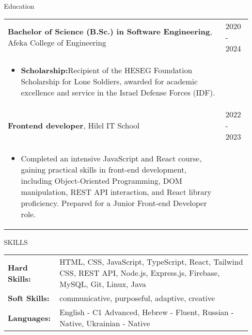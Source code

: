 \documentclass{resume}
\begin{document}

 \begin{rSection}{Education}

  \begin{tabular}{@{}p{}p{}}
  {\bf Bachelor of Science (B.Sc.) in Software Engineering}, Afeka College of Engineering & \hfill 2020 - 2024\hspace*{1em} \\
  \begin{itemize}
   \item \textbf{Scholarship:}Recipient of the HESEG Foundation Scholarship for Lone Soldiers, awarded for academic excellence and service in the Israel Defense Forces (IDF).
  \end{itemize}
  & \hfill \\
  {\bf Frontend developer}, Hilel IT School & \hfill 2022 - 2023\hspace*{1em} \\
  \begin{itemize}
   \item Completed an intensive JavaScript and React course, gaining practical skills in front-end development, including Object-Oriented Programming, DOM manipulation, REST API interaction, and React library proficiency. Prepared for a Junior Front-end Developer role.
  \end{itemize}
  \end{tabular}
 \end{rSection}

 \begin{rSection}{SKILLS}
  \begin{tabularx}{\textwidth}{@{}>{\textbullet\hspace{\labelsep}\bfseries}l X@{}}
   \vspace{0.5em}
   \hspace{\labelsep}Hard Skills: & HTML, CSS, JavaScript, TypeScript, React, Tailwind CSS, REST API, Node.js, Express.js, Firebase, MySQL, Git, Linux, Java \\
   \vspace{0.5em}
   \hspace{\labelsep}Soft Skills: & communicative, purposeful, adaptive, creative\\
   \vspace{0.5em}
   \hspace{\labelsep}Languages: & English - C1 Advanced, Hebrew - Fluent, Russian - Native, Ukrainian - Native
  \end{tabularx}
 \end{rSection}
\end{document}
